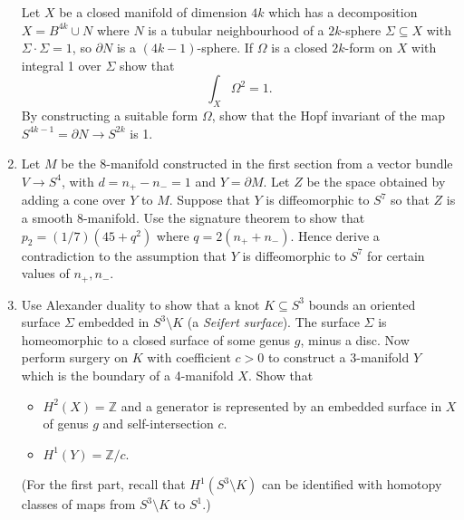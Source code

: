 \documentclass{article}
\theoremstyle{definition}
\newcommand{\Z}{\mathbb{Z}}
\begin{document}
\begin{enumerate}
        Let $X$ be a closed manifold of dimension $4k$ which has a decomposition
        $X=B^{4k}\cup N$ where $N$ is a tubular neighbourhood of a $2k$-sphere
        $\Sigma\subseteq X$ with $\Sigma\cdot\Sigma=1$, so $\partial N$ is a
        $(4k-1)$-sphere. If $\Omega$ is a closed $2k$-form on $X$ with integral
        1 over $\Sigma$ show that
        \begin{equation*}
            \int_X\Omega^2=1.
        \end{equation*}
        By constructing a suitable form $\Omega$, show that the Hopf invariant
        of the map $S^{4k-1}=\partial N\to S^{2k}$ is 1.


    \item Let $M$ be the 8-manifold constructed in the first section from a
        vector bundle $V\to S^4$, with $d=n_+-n_-=1$ and $Y=\partial M$. Let $Z$
        be the space obtained by adding a cone over $Y$ to $M$. Suppose that $Y$
        is diffeomorphic to $S^7$ so that $Z$ is a smooth 8-manifold. Use the
        signature theorem to show that $p_2=(1/7)(45+q^2)$ where $q=2(n_++n_-)$.
        Hence derive a contradiction to the assumption that $Y$ is diffeomorphic
        to $S^7$ for certain values of $n_+,n_-$.


    \item Use Alexander duality to show that a knot $K\subseteq S^3$ bounds an
        oriented surface $\Sigma$ embedded in $S^3\setminus K$ (a \emph{Seifert
        surface}). The surface $\Sigma$ is homeomorphic to a closed surface of
        some genus $g$, minus a disc. Now perform surgery on $K$ with
        coefficient $c>0$ to construct a 3-manifold $Y$ which is the boundary of
        a 4-manifold $X$. Show that
        \begin{itemize}
            \item $H^2(X)=\Z$ and a generator is represented by an embedded
                surface in $X$ of genus $g$ and self-intersection $c$.
            \item $H^1(Y)=\Z/c$.
        \end{itemize}
        (For the first part, recall that $H^1(S^3\setminus K)$ can be identified
        with homotopy classes of maps from $S^3\setminus K$ to $S^1$.)

\end{enumerate}
\end{document}
